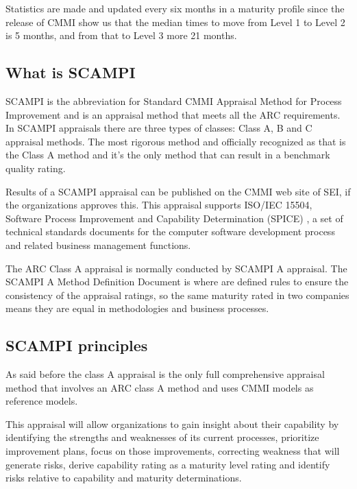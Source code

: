 Statistics are made and updated every six months in a maturity profile since the release of CMMI show us that the median times to move from Level 1 to Level 2 is 5 months, and from that to Level 3 more 21 months.

\subsection{What is SCAMPI}
SCAMPI is the abbreviation for Standard CMMI Appraisal Method for Process Improvement and is an appraisal method that meets all the ARC requirements.
In SCAMPI appraisals there are three types of classes: Class A, B and C appraisal methods. The most rigorous method and officially recognized as that is the Class A method and it's the only method that can result in a benchmark quality rating. 

Results of a SCAMPI appraisal can be published on the CMMI web site of SEI, if the organizations approves this. This appraisal supports ISO/IEC 15504, Software Process Improvement and Capability Determination (SPICE) \citep{dorling1993spice}, a set of technical standards documents for the computer software development process and related business management functions.

The ARC Class A appraisal is normally conducted by SCAMPI A appraisal. The SCAMPI A Method Definition Document is where are defined rules to ensure the consistency of the appraisal ratings, so the same maturity rated in two companies means they are equal in methodologies and business processes.


\subsection{SCAMPI principles}
As said before the class A appraisal is the only full comprehensive appraisal method that involves an ARC class A method and uses CMMI models as reference models.

This appraisal will allow organizations to gain insight about their capability by identifying the strengths and weaknesses of its current processes, prioritize improvement plans, focus on those improvements, correcting weakness that will generate risks, derive capability rating as a maturity level rating and identify risks relative to capability and maturity determinations.

